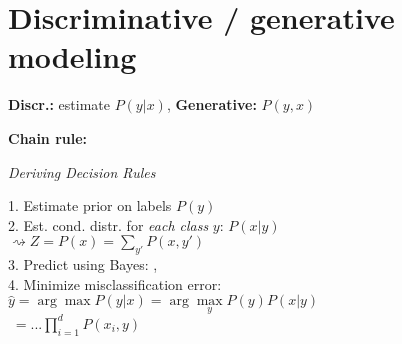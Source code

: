 \section{Discriminative / generative modeling}

\textbf{Discr.:} estimate $P(y\vert x)$, \enskip\textbf{Generative:} $P(y,x)$

\textbf{Chain rule:} 


\emph{Deriving Decision Rules}\vspace{1pt}
\begin{highlightbox}
	1. Estimate prior on labels $P(y)$\\
	2. Est. cond. distr. for \textit{each class} $y$: $P(x\vert y)$\\
	\phantom{2.} $\rightsquigarrow Z \!=\! P(x)  \!=\! \sum_{y'} P(x,y')$\\
	3. Predict using Bayes: ,\\
	4. Minimize misclassification error:\\
	\phantom{4.} $\hat y = \arg\!\max P(y\vert x) = \arg\!\max\limits_y P(y)P(x\vert y)$\vspace{-7pt}\\
	\phantom{4. $\hat y$}$\;= ... \prod_{i=1}^d P(x_i,y)$%
\end{highlightbox}


